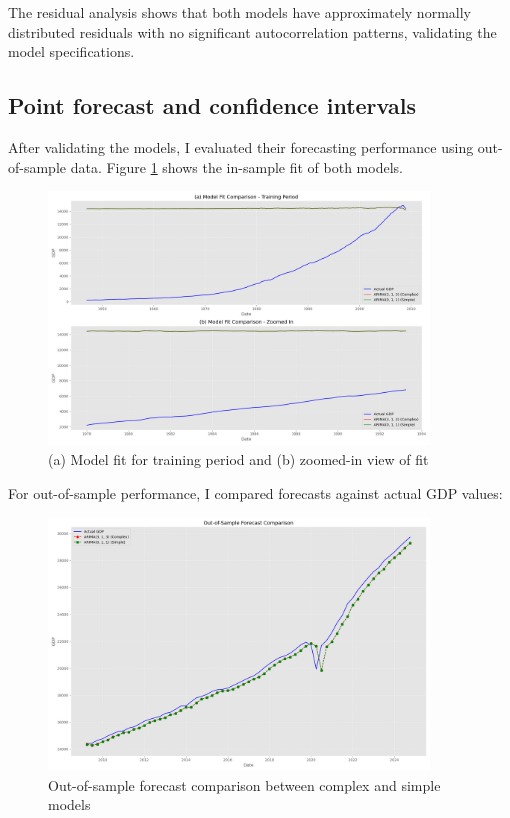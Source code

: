 \documentclass[11pt,a4paper]{article}
\begin{document}
The residual analysis shows that both models have approximately normally distributed residuals with no significant autocorrelation patterns, validating the model specifications.

\subsection{Point forecast and confidence intervals}

After validating the models, I evaluated their forecasting performance using out-of-sample data. Figure \ref{fig:fitted} shows the in-sample fit of both models.

\begin{figure}[H]
    \centering
    \includegraphics[width=0.9\textwidth]{plots/arima/gdp/figure7_fitted_actual_comparison.png}
    \caption{(a) Model fit for training period and (b) zoomed-in view of fit}
    \label{fig:fitted}
\end{figure}

For out-of-sample performance, I compared forecasts against actual GDP values:

\begin{figure}[H]
    \centering
    \includegraphics[width=0.9\textwidth]{plots/arima/gdp/figure8_forecast_comparison.png}
    \caption{Out-of-sample forecast comparison between complex and simple models}
    \label{fig:forecast}
\end{figure}
\end{document}
